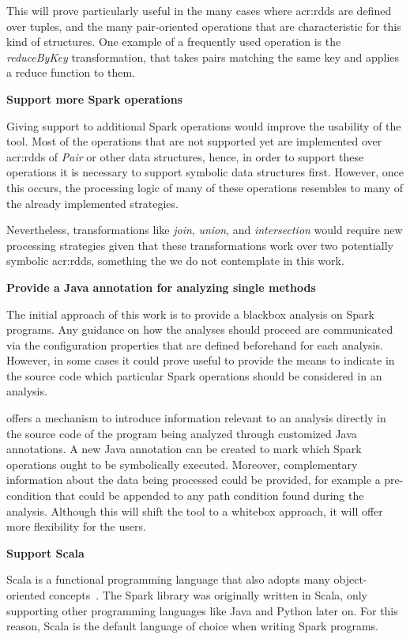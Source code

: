 This will prove particularly useful in the many cases where \acrshort{acr:rdd}s are defined over tuples, and the many pair-oriented operations that are characteristic for this kind of structures. One example of a frequently used operation is the \textit{reduceByKey} transformation, that takes pairs matching the same key and applies a reduce function to them.

\textbf{Support more Spark operations}

Giving support to additional Spark operations would improve the usability of the tool. Most of the operations that are not supported yet are implemented over \acrshort{acr:rdd}s of \textit{Pair} or other data structures, hence, in order to support these operations it is necessary to support symbolic data structures first. However, once this occurs, the processing logic of many of these operations resembles to many of the already implemented strategies.

Nevertheless, transformations like \textit{join}, \textit{union}, and \textit{intersection} would require new processing strategies given that these transformations work over two potentially symbolic \acrshort{acr:rdd}s, something the we do not contemplate in this work.

\textbf{Provide a Java annotation for analyzing single methods}

The initial approach of this work is to provide a blackbox analysis on Spark programs. Any guidance on how the analyses should proceed are communicated via the configuration properties that are defined beforehand for each analysis. However, in some cases it could prove useful to provide the means to indicate in the source code which particular Spark operations should be considered in an analysis.

\jpf{} offers a mechanism to introduce information relevant to an analysis directly in the source code of the program being analyzed through customized Java annotations. A new Java annotation can be created to mark which Spark operations ought to be symbolically executed. Moreover, complementary information about the data being processed could be provided, for example a pre-condition that could be appended to any path condition found during the analysis. Although this will shift the tool to a whitebox approach, it will offer more flexibility for the users. 

\textbf{Support Scala}

Scala is a functional programming language that also adopts many object-oriented concepts~\cite{WebScala2017}. The Spark library was originally written in Scala, only supporting other programming languages like Java and Python later on. For this reason, Scala is the default language of choice when writing Spark programs. 

